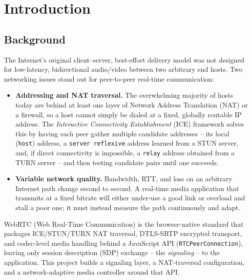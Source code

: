 \documentclass[12pt,a4paper]{report}
\begin{document}
\chapter{Introduction}

\section{Background}
The Internet's original client--server, best-effort delivery model was not designed for
low-latency, bidirectional audio/video between two arbitrary end hosts. Two networking
issues stand out for peer-to-peer real-time communication:

\begin{itemize}[nosep]
  \item \textbf{Addressing and NAT traversal.} The overwhelming majority of hosts today are
  behind at least one layer of Network Address Translation (NAT) or a firewall, so a host
  cannot simply be dialed at a fixed, globally routable IP address. The
  \emph{Interactive Connectivity Establishment} (ICE) framework solves this by having each
  peer gather multiple candidate addresses -- its local (\texttt{host}) address, a
  \texttt{server reflexive} address learned from a STUN server, and, if direct connectivity
  is impossible, a \texttt{relay} address obtained from a TURN server -- and then testing
  candidate pairs until one succeeds.
  \item \textbf{Variable network quality.} Bandwidth, RTT, and loss on an arbitrary
  Internet path change second to second. A real-time media application that transmits at a
  fixed bitrate will either under-use a good link or overload and stall a poor one; it must
  instead measure the path continuously and adapt.
\end{itemize}

WebRTC (Web Real-Time Communication) is the browser-native standard that packages ICE/STUN/TURN
NAT traversal, DTLS-SRTP encrypted transport, and codec-level media handling behind a
JavaScript API (\texttt{RTCPeerConnection}), leaving only session description (SDP)
exchange -- the \emph{signaling} -- to the application. This project builds a signaling
layer, a NAT-traversal configuration, and a network-adaptive media controller around that
API.
\end{document}
